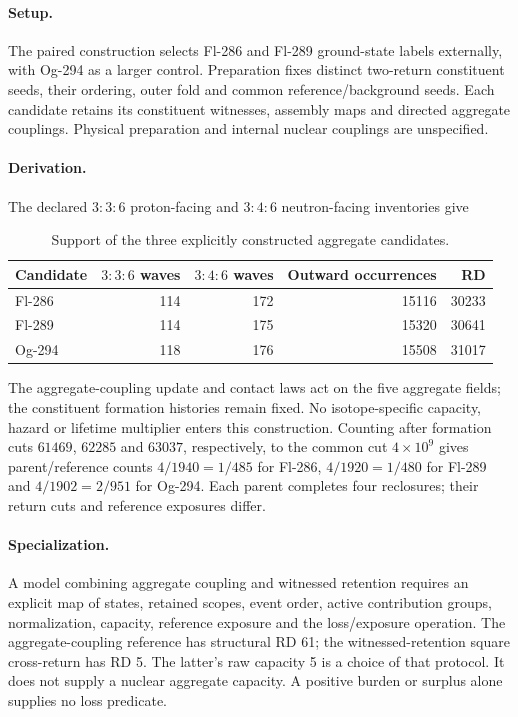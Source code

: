 \paragraph{Setup.}
The paired construction selects Fl-286 and Fl-289 ground-state labels externally,
with Og-294 as a larger control. Preparation fixes distinct two-return constituent
seeds, their ordering, outer fold and common reference/background seeds. Each
candidate retains its constituent witnesses, assembly maps and directed aggregate
couplings. Physical preparation and internal nuclear couplings are unspecified.

\paragraph{Derivation.}
The declared \(3{:}3{:}6\) proton-facing and \(3{:}4{:}6\) neutron-facing
inventories give
\begin{table}[H]
\centering\small
\caption{Support of the three explicitly constructed aggregate candidates.}
\label{tab:manual2-paired-constructions}
\begin{tabular}{@{}lrrrr@{}}
\toprule
Candidate & \(3{:}3{:}6\) waves & \(3{:}4{:}6\) waves & Outward occurrences & RD\\
\midrule
Fl-286 & 114 & 172 & 15116 & 30233\\
Fl-289 & 114 & 175 & 15320 & 30641\\
Og-294 & 118 & 176 & 15508 & 31017\\
\bottomrule
\end{tabular}
\end{table}
The aggregate-coupling update and contact laws act on the five aggregate fields;
the constituent formation histories remain fixed. No isotope-specific capacity,
hazard or lifetime multiplier enters this construction.
Counting after formation cuts \(61469\), \(62285\) and \(63037\), respectively,
to the common cut \(4\times10^9\) gives parent/reference counts
\(4/1940=1/485\) for Fl-286, \(4/1920=1/480\) for Fl-289 and
\(4/1902=2/951\) for Og-294. Each parent completes four reclosures;
their return cuts and reference exposures differ.

\paragraph{Specialization.}
A model combining aggregate coupling and witnessed retention requires an explicit map of states, retained scopes,
event order, active contribution groups, normalization, capacity, reference
exposure and the loss/exposure operation. The aggregate-coupling reference has structural RD 61;
the witnessed-retention square cross-return has RD 5. The latter's raw capacity 5 is a choice of
that protocol. It does not supply a nuclear aggregate capacity. A positive
burden or surplus alone supplies no loss predicate.


